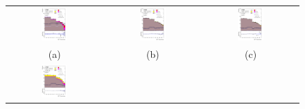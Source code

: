 \begin{figure}[H]
\begin{tabular}{@{}ccc@{}}
\includegraphics[width=0.29\textwidth]{figures/BDT/tuH_reg1l2tau1bnj_os.pdf}&
\includegraphics[width=0.29\textwidth]{figures/BDT/tuH_reg1l1tau1b1j_ss.pdf}&
\includegraphics[width=0.29\textwidth]{figures/BDT/tuH_reg1l1tau1b2j_ss.pdf}\\
(a)  & (b) & (c) \\
\includegraphics[width=0.29\textwidth]{figures/BDT/tuH_reg1l1tau1b2j_os.pdf}&

\end{tabular}
\end{figure}
